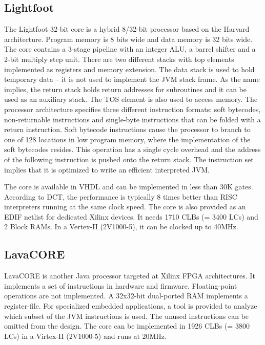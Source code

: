 \subsection{Lightfoot}

The Lightfoot 32-bit core \cite{Lightfoot} is a hybrid 8/32-bit
processor based on the Harvard architecture. Program memory is 8
bits wide and data memory is 32 bits wide. The core contains a
3-stage pipeline with an integer ALU, a barrel shifter and a 2-bit
multiply step unit. There are two different stacks with top elements
implemented as registers and memory extension. The data stack is
used to hold temporary data -- it is not used to implement the JVM
stack frame. As the name implies, the return stack holds return
addresses for subroutines and it can be used as an auxiliary stack.
The TOS element is also used to access memory. The processor
architecture specifies three different instruction formats: soft
bytecodes, non-returnable instructions and single-byte instructions
that can be folded with a return instruction. Soft bytecode
instructions cause the processor to branch to one of 128 locations
in low program memory, where the implementation of the soft
bytecodes resides. This operation has a single cycle overhead and
the address of the following instruction is pushed onto the return
stack. The instruction set implies that it is optimized to write an
efficient interpreted JVM.


The core is available in VHDL and can be implemented in less than
30K gates. According to DCT, the performance is typically 8 times
better than RISC interpreters running at the same clock speed. The
core is also provided as an EDIF netlist for dedicated Xilinx
devices. It needs 1710 CLBs (= 3400 LCs) and 2 Block RAMs. In a
Vertex-II (2V1000-5), it can be clocked up to 40MHz.


\subsection{LavaCORE}

LavaCORE \cite{LavaCORE} is another Java processor targeted at
Xilinx FPGA architectures. It implements a set of instructions in
hardware and firmware. Floating-point operations are not
implemented. A 32x32-bit dual-ported RAM implements a register-file.
For specialized embedded applications, a tool is provided to analyze
which subset of the JVM instructions is used. The unused
instructions can be omitted from the design. The core can be
implemented in 1926 CLBs (= 3800 LCs) in a Virtex-II (2V1000-5) and
runs at 20MHz.

